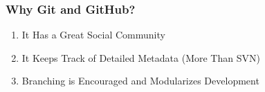 \begin{frame}
\frametitle{\large{Why Git and GitHub?}}
\begin{enumerate}
\item It Has a Great Social Community
\item It Keeps Track of Detailed Metadata (More Than SVN)
\item Branching is Encouraged and Modularizes Development
\end{enumerate}
\end{frame}



\frame{
\frametitle{\large{}}
	\huge{\center{\color{RUBblau}{Thank you for your attention.}}}
}


